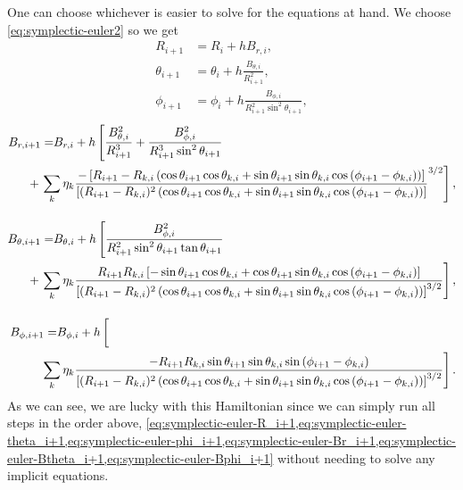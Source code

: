 One can choose whichever is easier to solve for the equations at hand. We choose \cref{eq:symplectic-euler2} so we get
\begin{align}
    R_{i+1} &= R_i + h B_{r,i} \label{eq:symplectic-euler-R_i+1}, \\[0.4cm]
    \theta_{i+1} &= \theta_i + h \frac{B_{\theta,i}}{R_{i+1}^2}, \label{eq:symplectic-euler-theta_i+1} \\[0.4cm]
    \phi_{i+1} &= \phi_i + h \frac{B_{\phi,i}}{R_{i+1}^2 \sin^2{\theta_{i+1}}}, \label{eq:symplectic-euler-phi_i+1}
\end{align}
\begin{align}    
    \begin{aligned}
        B_{r,i+1} = & B_{r,i} + h \left[ \frac{B_{\theta,i}^2}{R_{i+1}^3} + \frac{B_{\phi,i}^2}{R_{i+1}^3 \sin^2{\theta_{i+1}}} \right. \\
        & \hspace{-22.0pt} + \left. \sum\limits_{k} \eta_k \frac{-\left[R_{i+1} - R_{k,i} \left(\cos{\theta_{i+1}}\cos{\theta_{k,i}} + \sin{\theta_{i+1}}\sin{\theta_{k,i}}\cos{(\phi_{i+1} - \phi_{k,i})}\right) \right]}{\left[(R_{i+1} - R_{k,i})^2 \left(\cos{\theta_{i+1}}\cos{\theta_{k,i}} + \sin{\theta_{i+1}}\sin{\theta_{k,i}}\cos{(\phi_{i+1} - \phi_{k,i})} \right) \right]}^{3/2} \right] , \label{eq:symplectic-euler-Br_i+1}
    \end{aligned} \\[0.4cm]
    \begin{aligned}
        B_{\theta,i+1} = & B_{\theta,i} + h \left[ \frac{B_{\phi,i}^2}{R_{i+1}^2 \sin^2{\theta_{i+1}} \tan{\theta_{i+1}}} \right. \\
        & \hspace{-22.0pt} + \left. \sum\limits_{k} \eta_k \frac{R_{i+1} R_{k,i} \left[-\sin{\theta_{i+1}}\cos{\theta_{k,i}} + \cos{\theta_{i+1}}\sin{\theta_{k,i}}\cos{(\phi_{i+1} - \phi_{k,i})} \right]}{\left[(R_{i+1} - R_{k,i})^2 \left(\cos{\theta_{i+1}}\cos{\theta_{k,i}} + \sin{\theta_{i+1}}\sin{\theta_{k,i}}\cos{(\phi_{i+1} - \phi_{k,i})} \right) \right]^{3/2}} \right], \label{eq:symplectic-euler-Btheta_i+1}
    \end{aligned} \\[0.4cm]
    \begin{aligned}
        B_{\phi,i+1} = & B_{\phi,i} + h \left[ \vphantom{\frac12} \right.\\
        & \hspace{-22.0pt} \hphantom{+} \left. \sum\limits_{k} \eta_k \frac{- R_{i+1} R_{k,i} \sin{\theta_{i+1}}\sin{\theta_{k,i}}\sin{(\phi_{i+1} - \phi_{k,i})}}{\left[(R_{i+1} - R_{k,i})^2 \left(\cos{\theta_{i+1}}\cos{\theta_{k,i}} + \sin{\theta_{i+1}}\sin{\theta_{k,i}}\cos{(\phi_{i+1} - \phi_{k,i})} \right) \right]^{3/2}} \right]. \label{eq:symplectic-euler-Bphi_i+1}
    \end{aligned}
\end{align}
As we can see, we are lucky with this Hamiltonian since we can simply run all steps in the order above, \cref{eq:symplectic-euler-R_i+1,eq:symplectic-euler-theta_i+1,eq:symplectic-euler-phi_i+1,eq:symplectic-euler-Br_i+1,eq:symplectic-euler-Btheta_i+1,eq:symplectic-euler-Bphi_i+1} without needing to solve any implicit equations.
